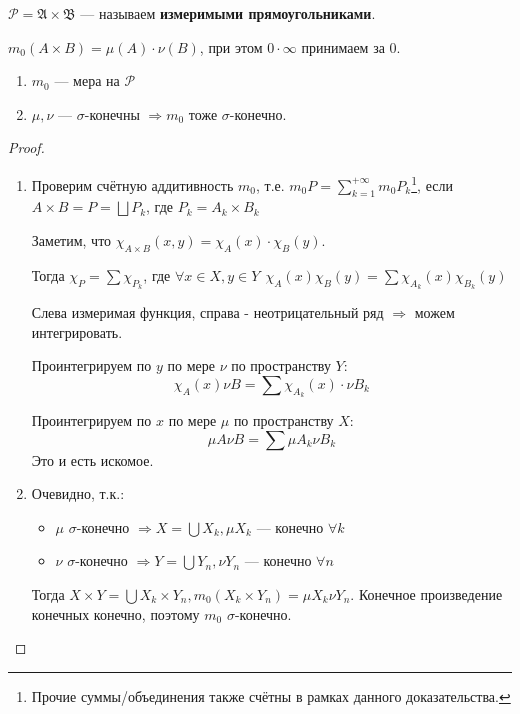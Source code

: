 \begin{obozn}
    \(\mathcal{P} = \mathfrak{A} \times \mathfrak{B}\) --- называем \textbf{измеримыми прямоугольниками}.

    \(m_0(A \times B) = \mu(A) \cdot \nu(B)\), при этом \(0 \cdot \infty\) принимаем за \(0\).
\end{obozn}
\begin{theorem}\itemfix
    \begin{enumerate}
        \item \(m_0\) --- мера на \(\mathcal{P}\)
        \item \(\mu, \nu\) --- \(\sigma\)-конечны \( \Rightarrow m_0\) тоже \(\sigma\)-конечно.
    \end{enumerate}
\end{theorem}
\begin{proof}\itemfix
    \begin{enumerate}
        \item Проверим счётную аддитивность \(m_0\), т.е. \(m_0 P = \sum_{k = 1}^{+\infty} m_0 P_k\)\footnote{Прочие суммы/объединения также счётны в рамках данного доказательства.}, если \(A \times B = P = \bigsqcup P_k\), где \(P_k = A_k \times B_k\)

              Заметим, что \(\chi_{A \times B}(x, y) = \chi_A(x) \cdot \chi_B(y)\).

              Тогда \(\chi_P = \sum \chi_{P_k}\), где \(\forall x\in X, y\in Y \ \ \chi_A(x) \chi_B(y) = \sum \chi_{A_k}(x) \chi_{B_k}(y)\)

              Слева измеримая функция, справа - неотрицательный ряд \(\Rightarrow\) можем интегрировать.

              Проинтегрируем по \(y\) по мере \(\nu\) по пространству \(Y\):
              \[\chi_A(x) \nu B = \sum \chi_{A_k}(x) \cdot \nu B_k\]

              Проинтегрируем по \(x\) по мере \(\mu\) по пространству \(X\):
              \[\mu A \nu B = \sum \mu A_k \nu B_k\]
              Это и есть искомое.

        \item Очевидно, т.к.:
              \begin{itemize}
                  \item \(\mu\) \(\sigma\)-конечно \( \Rightarrow X = \bigcup X_k, \mu X_k\) --- конечно \(\forall k\)
                  \item \(\nu\) \(\sigma\)-конечно \( \Rightarrow Y = \bigcup Y_n, \nu Y_n\) --- конечно \(\forall n\)
              \end{itemize}

              Тогда \(X \times Y = \bigcup X_k \times Y_n, m_0(X_k \times Y_n) = \mu X_k \nu Y_n\). Конечное произведение конечных конечно, поэтому \(m_0\) \(\sigma\)-конечно.
    \end{enumerate}
\end{proof}


